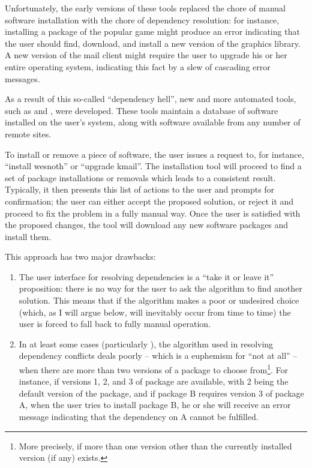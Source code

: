 \documentclass[letterpaper]{article}
\theoremstyle{definition}
\theoremstyle{remark}
\newcommand{\pkg}[1]{\text{\url{#1}}}
\begin{document}
Unfortunately, the early versions of these tools replaced the chore of
manual software installation with the chore of dependency resolution:
for instance, installing a package of the popular game \pkg{wesnoth}
might produce an error indicating that the user should find, download,
and install a new version of the \pkg{SDL} graphics library.  A new
version of the \pkg{kmail} mail client might require the user to
upgrade his or her entire operating system, indicating this fact by a
slew of cascading error messages.

As a result of this so-called ``dependency hell'', new and more
automated tools, such as \pkg{apt} and \pkg{up2date}, were developed.
These tools maintain a database of software installed on the user's
system, along with software available from any number of remote sites.

To install or remove a piece of software, the user issues a request
to, for instance, ``install wesnoth'' or ``upgrade kmail''.  The
installation tool will proceed to find a set of package installations
or removals which leads to a consistent result.  Typically, it then
presents this list of actions to the user and prompts for
confirmation; the user can either accept the proposed solution, or
reject it and proceed to fix the problem in a fully manual way.  Once
the user is satisfied with the proposed changes, the tool will
download any new software packages and install them.

This approach has two major drawbacks:

\begin{enumerate}
\item The user interface for resolving dependencies is a ``take it or
  leave it'' proposition: there is no way for the user to ask the
  algorithm to find another solution.  This means that if the
  algorithm makes a poor or undesired choice (which, as I will argue
  below, will inevitably occur from time to time) the user is forced
  to fall back to fully manual operation.

\item In at least some cases (particularly \pkg{apt}), the algorithm used
  in resolving dependency conflicts deals poorly -- which is a
  euphemism for ``not at all'' -- when there are more than two
  versions of a package to choose from\footnote{More precisely, if
    more than one version other than the currently installed version
    (if any) exists.}.  For instance, if versions 1, 2, and 3 of
  package \pkg{A} are available, with 2 being the default version of
  the package, and if package B requires version 3 of package A, when
  the user tries to install package B, he or she will receive an error
  message indicating that the dependency on A cannot be fulfilled.
\end{enumerate}
\end{document}
